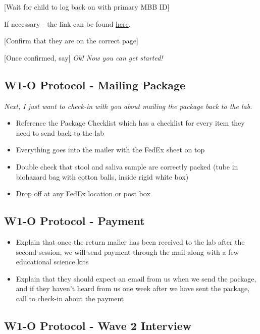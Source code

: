 \documentclass[
]{book}
\providecommand{\tightlist}{%
  \setlength{\itemsep}{0pt}\setlength{\parskip}{0pt}}
\begin{document}
{[}Wait for child to log back on with primary MBB ID{]}

If necessary - the link can be found \href{https://research.sc/participant/login/20451/publicid}{here}.

{[}Confirm that they are on the correct page{]}

{[}Once confirmed, say{]} \emph{Ok! Now you can get started!}

\hypertarget{w1-o-protocol---mailing-package}{%
\subsection{W1-O Protocol - Mailing Package}\label{w1-o-protocol---mailing-package}}

\emph{Next, I just want to check-in with you about mailing the package back to the lab.}

\begin{itemize}
\tightlist
\item
  Reference the Package Checklist which has a checklist for every item they need to send back to the lab
\item
  Everything goes into the mailer with the FedEx sheet on top
\item
  Double check that stool and saliva sample are correctly packed (tube in biohazard bag with cotton balls, inside rigid white box)
\item
  Drop off at any FedEx location or post box
\end{itemize}

\hypertarget{w1-o-protocol---payment}{%
\subsection{W1-O Protocol - Payment}\label{w1-o-protocol---payment}}

\begin{itemize}
\tightlist
\item
  Explain that once the return mailer has been received to the lab after the second session, we will send payment through the mail along with a few educational science kits
\item
  Explain that they should expect an email from us when we send the package, and if they haven't heard from us one week after we have sent the package, call to check-in about the payment
\end{itemize}

\hypertarget{w1-o-protocol---wave-2-interview}{%
\subsection{W1-O Protocol - Wave 2 Interview}\label{w1-o-protocol---wave-2-interview}}
\end{document}
